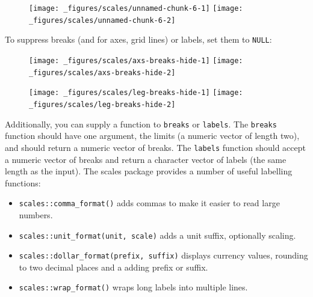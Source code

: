 \begin{figure}[H]
  \texttt{[image: \_figures/scales/unnamed-chunk-6-1]}%
  \texttt{[image: \_figures/scales/unnamed-chunk-6-2]}
\end{figure}

To suppress breaks (and for axes, grid lines) or labels, set them to
\texttt{NULL}:

\begin{Shaded}
\begin{Highlighting}[]
\StringTok{ }\NormalTok{(} \NormalTok{)}
\StringTok{ }\NormalTok{(} \NormalTok{)}
\end{Highlighting}
\end{Shaded}

\begin{figure}[H]
  \texttt{[image: \_figures/scales/axs-breaks-hide-1]}%
  \texttt{[image: \_figures/scales/axs-breaks-hide-2]}
\end{figure}

\begin{Shaded}
\begin{Highlighting}[]
\StringTok{ }\NormalTok{(} \NormalTok{)}
\StringTok{ }\NormalTok{(} \NormalTok{)}
\end{Highlighting}
\end{Shaded}

\begin{figure}[H]
  \texttt{[image: \_figures/scales/leg-breaks-hide-1]}%
  \texttt{[image: \_figures/scales/leg-breaks-hide-2]}
\end{figure}

Additionally, you can supply a function to \texttt{breaks} or
\texttt{labels}. The \texttt{breaks} function should have one argument,
the limits (a numeric vector of length two), and should return a numeric
vector of breaks. The \texttt{labels} function should accept a numeric
vector of breaks and return a character vector of labels (the same
length as the input). The scales package provides a number of useful
labelling functions:

\begin{itemize}
\item
  \texttt{scales::comma\_format()} adds commas to make it easier to read
  large numbers.
\item
  \texttt{scales::unit\_format(unit, scale)} adds a unit suffix,
  optionally scaling.
\item
  \texttt{scales::dollar\_format(prefix, suffix)} displays currency
  values, rounding to two decimal places and a adding prefix or suffix.
\item
  \texttt{scales::wrap\_format()} wraps long labels into multiple lines.
\end{itemize}

